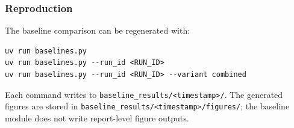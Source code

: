 \subsubsection{Reproduction}

The baseline comparison can be regenerated with:

\begin{verbatim}
uv run baselines.py
uv run baselines.py --run_id <RUN_ID>
uv run baselines.py --run_id <RUN_ID> --variant combined
\end{verbatim}

Each command writes to \texttt{baseline\_results/<timestamp>/}. The generated figures are stored in \texttt{baseline\_results/<timestamp>/figures/}; the baseline module does not write report-level figure outputs.
